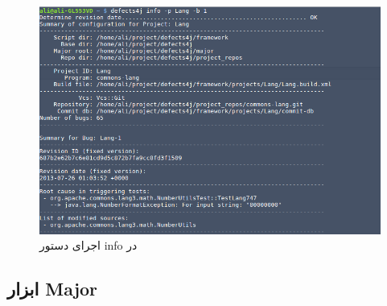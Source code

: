 \begin{figure}[H]
	\centering
	\includegraphics[width=.8\textwidth]{img/case_study/d4j-info-commadn.png}
	\caption{اجرای دستور info در }
	\label{fig:d4j-info-command}
\end{figure}

\subsection{ابزار Major}

